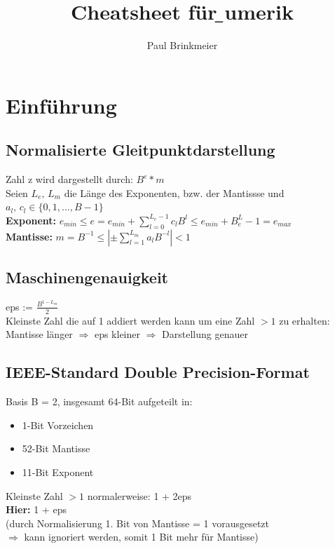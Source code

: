 \documentclass[a4paper, 14pt]{article}
\author{Paul Brinkmeier}
\title{Cheatsheet für \b{}umerik}
\begin{document}
	\maketitle
	\newpage
	\tableofcontents
	\newpage

    \section{Einf\"uhrung}

    \subsection{Normalisierte Gleitpunktdarstellung}
    Zahl z wird dargestellt durch: $B^{e} * m$\\
    Seien $L_e,\, L_m$ die L\"ange des Exponenten, bzw. der Mantissse und $a_l,\, c_l \in \{0,1,...,B-1\}$\\
    \textbf{Exponent:} $e_{min} \leq e = e_{min} + \sum\limits_{l=0}^{L_e-1} c_l B^l \leq e_{min} + B^L_e - 1 = e_{max}$\\
    \textbf{Mantisse:} $m = B^{-1} \leq |\pm\sum\limits_{l=1}^{L_m} a_l B^{-l}| < 1$

    \subsection{Maschinengenauigkeit}
    eps := $\frac{B^{1-L_m}}{2}$\\
    Kleinste Zahl die auf 1 addiert werden kann um eine Zahl $>1$ zu erhalten:\\
    Mantisse l\"anger $\Rightarrow$ eps kleiner $\Rightarrow$ Darstellung genauer

    \subsection{IEEE-Standard Double Precision-Format}
    Basis B = 2, insgesamt 64-Bit aufgeteilt in:
    \begin{itemize}
        \item 1-Bit Vorzeichen
        \item 52-Bit Mantisse
        \item 11-Bit Exponent
    \end{itemize}
    Kleinste Zahl $>1$ normalerweise: 1 + 2eps\\
    \textbf{Hier:} 1 + eps\\
    (durch Normalisierung 1. Bit von Mantisse = 1 vorausgesetzt\\
    $\Rightarrow$ kann ignoriert werden, somit 1 Bit mehr f\"ur Mantisse)
\end{document}

